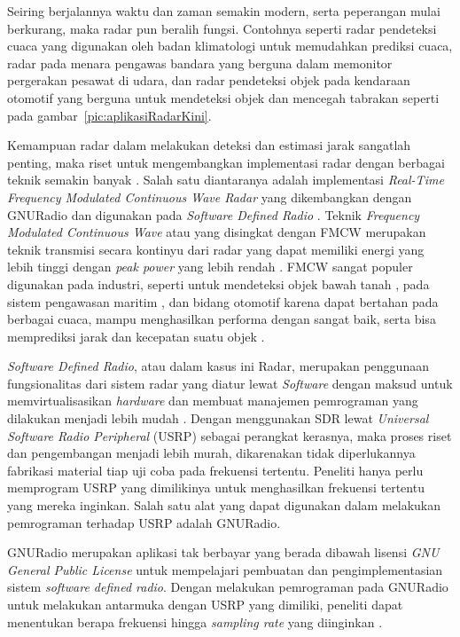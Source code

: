 Seiring berjalannya waktu dan zaman semakin modern, serta peperangan mulai berkurang, maka radar pun beralih fungsi. Contohnya seperti radar pendeteksi cuaca yang digunakan oleh badan klimatologi untuk memudahkan prediksi cuaca, radar pada menara pengawas bandara yang berguna dalam memonitor pergerakan pesawat di udara, dan radar pendeteksi objek pada kendaraan otomotif yang berguna untuk mendeteksi objek dan mencegah tabrakan seperti pada gambar~\ref{pic:aplikasiRadarKini}.

Kemampuan radar dalam melakukan deteksi dan estimasi jarak sangatlah penting, maka riset untuk mengembangkan implementasi radar dengan berbagai teknik semakin banyak \cite{Jia2020,Xia2021,MoraHuaman2020,Sundaresan2015}. Salah satu diantaranya adalah implementasi \textit{Real-Time Frequency Modulated Continuous Wave Radar} yang dikembangkan dengan GNURadio dan digunakan pada \textit{Software Defined Radio} \cite{Sundaresan2015}. Teknik \textit{Frequency Modulated Continuous Wave} atau yang disingkat dengan FMCW merupakan teknik transmisi secara kontinyu dari radar yang dapat memiliki energi yang lebih tinggi dengan \textit{peak power} yang lebih rendah \cite{Stasiak2017}. FMCW sangat populer digunakan pada industri, seperti untuk mendeteksi objek bawah tanah \cite{Macasero2018}, pada sistem pengawasan maritim \cite{Lestari2017}, dan bidang otomotif  karena dapat bertahan pada berbagai cuaca, mampu menghasilkan performa dengan sangat baik, serta bisa memprediksi jarak dan kecepatan suatu objek \cite{Deng2017}. 

\textit{Software Defined Radio}, atau dalam kasus ini Radar, merupakan penggunaan fungsionalitas dari sistem radar yang diatur lewat \textit{Software} dengan maksud untuk memvirtualisasikan \textit{hardware} dan membuat manajemen pemrograman yang dilakukan menjadi lebih mudah \cite{Zeng2019}. Dengan menggunakan SDR lewat \textit{Universal Software Radio Peripheral} (USRP) sebagai perangkat kerasnya, maka proses riset dan pengembangan menjadi lebih murah, dikarenakan tidak diperlukannya fabrikasi material tiap uji coba pada frekuensi tertentu. Peneliti hanya perlu memprogram USRP yang dimilikinya untuk menghasilkan frekuensi tertentu yang mereka inginkan. Salah satu alat yang dapat digunakan dalam melakukan pemrograman terhadap USRP adalah GNURadio.


GNURadio merupakan aplikasi tak berbayar yang berada dibawah lisensi \textit{GNU General Public License} untuk mempelajari pembuatan dan pengimplementasian sistem \textit{software defined radio}. Dengan melakukan pemrograman pada GNURadio untuk melakukan antarmuka dengan USRP yang dimiliki, peneliti dapat menentukan berapa frekuensi hingga \textit{sampling rate} yang diinginkan \cite{Prabaswara2011}.

